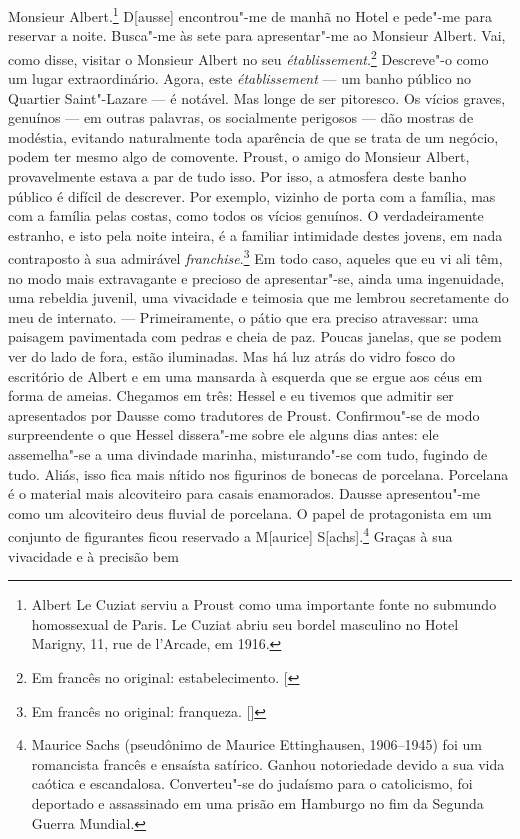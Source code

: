 Monsieur Albert.\footnote{Albert Le Cuziat
  serviu a Proust como uma importante fonte no submundo homossexual de
  Paris. Le Cuziat abriu seu bordel
  masculino no Hotel Marigny, 11, rue de l'Arcade, em 1916. \versal{[N.~O.]}}
D{[}ausse{]} encontrou"-me de manhã no Hotel e pede"-me para reservar a
noite. Busca"-me às sete para apresentar"-me ao Monsieur Albert. Vai, como
disse, visitar o Monsieur Albert no seu \emph{établissement}.\footnote{Em francês no original: estabelecimento. {[}\versal{N.~T.}{]}} Descreve"-o
como um lugar extraordinário. Agora, este \emph{établissement} --- um
banho público no Quartier Saint"-Lazare --- é notável. Mas longe de ser
pitoresco. Os vícios graves, genuínos --- em outras palavras, os
socialmente perigosos --- dão mostras de modéstia, evitando naturalmente
toda aparência de que se trata de um negócio, podem ter mesmo algo de
comovente. Proust, o amigo do Monsieur Albert, provavelmente estava a
par de tudo isso. Por isso, a atmosfera deste banho público é difícil de
descrever. Por exemplo, vizinho de porta com a família, mas com a
família pelas costas, como todos os vícios genuínos. O verdadeiramente
estranho, e isto pela noite inteira, é a familiar intimidade destes
jovens, em nada contraposto à sua admirável \emph{franchise}.\footnote{Em francês no original: franqueza. []} Em
todo caso, aqueles que eu vi ali têm, no modo mais extravagante e
precioso de apresentar"-se, ainda uma ingenuidade, uma rebeldia juvenil,
uma vivacidade e teimosia que me lembrou secretamente do meu de
internato. --- Primeiramente, o pátio que era preciso atravessar: uma paisagem pavimentada com pedras e cheia de paz. Poucas janelas, que se podem ver do lado de
fora, estão iluminadas. Mas há luz atrás do vidro fosco do escritório de Albert e
em uma mansarda à esquerda que se ergue aos céus em forma de ameias. Chegamos
em três: Hessel e eu tivemos que admitir ser apresentados por Dausse como
tradutores de Proust. Confirmou"-se de modo surpreendente o que Hessel
dissera"-me sobre ele alguns dias antes: ele assemelha"-se a uma divindade
marinha, misturando"-se com tudo, fugindo de tudo. Aliás, isso fica mais
nítido nos figurinos de bonecas de porcelana. Porcelana é o material
mais alcoviteiro para casais enamorados. Dausse apresentou"-me como um %
alcoviteiro deus fluvial de porcelana. O papel de protagonista em um
conjunto de figurantes ficou reservado a M{[}aurice{]}
S{[}achs{]}.\footnote{Maurice Sachs (pseudônimo de Maurice
  Ettinghausen, 1906--1945) foi um romancista francês e ensaísta satírico.
  Ganhou notoriedade devido a sua vida caótica e escandalosa.
  Converteu"-se do judaísmo para o catolicismo,
  foi deportado e assassinado em uma prisão em Hamburgo no
  fim da Segunda Guerra Mundial. \versal{[N.~O.]}} Graças à sua vivacidade e à precisão bem
